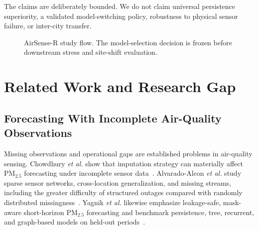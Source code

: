 \documentclass[journal]{IEEEtran}
\begin{document}
The claims are deliberately bounded. We do not claim universal persistence superiority, a validated model-switching policy, robustness to physical sensor failure, or inter-city transfer.

\begin{figure}[!t]
\centering
{}
\caption{AirSense-R study flow. The model-selection decision is frozen before downstream stress and site-shift evaluation.}
\label{fig:story}
\end{figure}

\section{Related Work and Research Gap}

\subsection{Forecasting With Incomplete Air-Quality Observations}
Missing observations and operational gaps are established problems in air-quality sensing. Chowdhury \emph{et al.} show that imputation strategy can materially affect PM$_{2.5}$ forecasting under incomplete sensor data~\cite{chowdhury2026imputation}. Alvarado-Alcon \emph{et al.} study sparse sensor networks, cross-location generalization, and missing streams, including the greater difficulty of structured outages compared with randomly distributed missingness~\cite{alvaradoalcon2026citywide}. Yagnik \emph{et al.} likewise emphasize leakage-safe, mask-aware short-horizon PM$_{2.5}$ forecasting and benchmark persistence, tree, recurrent, and graph-based models on held-out periods~\cite{yagnik2026leakage}.
\end{document}
